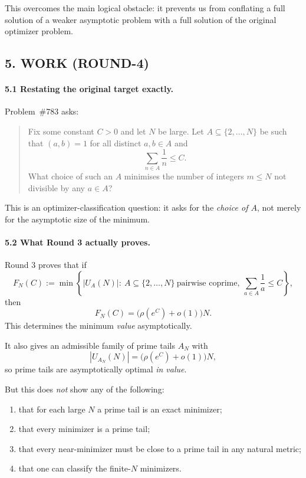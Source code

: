 This overcomes the main logical obstacle: it prevents us from conflating a full solution of a weaker asymptotic problem with a full solution of the original optimizer problem.

\subsection*{5. WORK (ROUND-4)}

\paragraph{5.1 Restating the original target exactly.}

Problem~\#783 asks:

\begin{quote}
	Fix some constant $C>0$ and let $N$ be large.  Let $A\subseteq\{2,\dots,N\}$ be such that $(a,b)=1$ for all distinct $a,b\in A$ and
	\[
	\sum_{n\in A}\frac1n\le C.
	\]
	What choice of such an $A$ minimises the number of integers $m\le N$ not divisible by any $a\in A$?
\end{quote}

This is an optimizer-classification question: it asks for the \emph{choice of $A$}, not merely for the asymptotic size of the minimum.

\paragraph{5.2 What Round 3 actually proves.}

Round 3 proves that if
\[
F_N(C):=\min\left\{|U_A(N)|:\ A\subseteq\{2,\dots,N\}\ \text{pairwise coprime},\ \sum_{a\in A}\frac1a\le C\right\},
\]
then
\[
F_N(C)=\bigl(\rho(e^C)+o(1)\bigr)N.
\]
This determines the minimum \emph{value} asymptotically.

It also gives an admissible family of prime tails $A_N$ with
\[
|U_{A_N}(N)|=\bigl(\rho(e^C)+o(1)\bigr)N,
\]
so prime tails are asymptotically optimal \emph{in value}.

But this does \emph{not} show any of the following:

\begin{enumerate}
	\item that for each large $N$ a prime tail is an exact minimizer;
	\item that every minimizer is a prime tail;
	\item that every near-minimizer must be close to a prime tail in any natural metric;
	\item that one can classify the finite-$N$ minimizers.
\end{enumerate}

